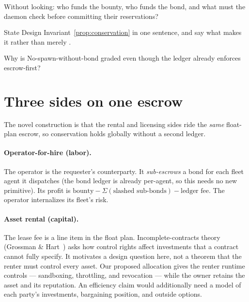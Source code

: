 \documentclass[11pt,a4paper]{article}
\theoremstyle{definition}
\theoremstyle{definition}
\theoremstyle{remark}
\begin{document}
\pdexercisepointer*{\ref{ex:he-partial-settlement-trace}}{\ref{ex:he-floatplan-amendment}}{\pageref{ex:he-partial-settlement-trace}}

\begin{pdrecitation}
\item Without looking: who funds the bounty, who funds the bond, and what must the daemon check before committing their reservations?
\item State Design Invariant~\ref{prop:conservation} in one sentence, and say what makes it \Built{} rather than merely \Designed{}.
\item Why is No-spawn-without-bond graded \BuiltWeak{} even though the ledger already enforces escrow-first?
\end{pdrecitation}

\section{Three sides on one escrow}\label{sec:three-on-one}

The novel construction is that the rental and licensing sides ride the \emph{same}
float-plan escrow, so conservation holds globally without a second ledger.

\paragraph{Operator-for-hire (labor).} The operator is the requester's
counterparty. It \emph{sub-escrows} a bond for each fleet agent it dispatches (the
bond ledger is already per-agent, so this needs no new primitive). Its profit is
$\text{bounty} - \Sigma(\text{slashed sub-bonds}) - \text{ledger fee}$. The
operator internalizes its fleet's risk.

\paragraph{Asset rental (capital).} The lease fee is a line item in the float plan.
Incomplete-contracts theory (Grossman \& Hart~) asks how
control rights affect investments that a contract cannot fully specify. It
motivates a design question here, not a theorem that the renter must control
every asset. Our proposed allocation gives the renter runtime controls ---
sandboxing, throttling, and revocation --- while the owner retains the asset
and its reputation. An efficiency claim would additionally need a model of
each party's investments, bargaining position, and outside options.
\end{document}
